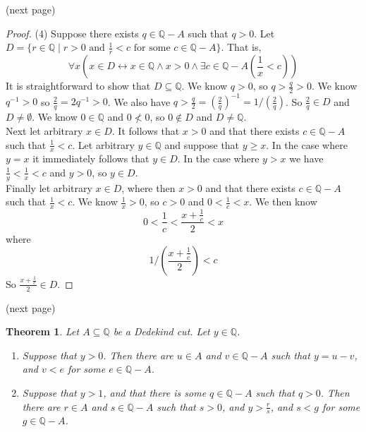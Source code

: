 \documentclass{report}
\newtheorem{theorem}[theo]{Theorem}
\begin{document}
\noindent(next page)\newpage
\begin{proof}(4)
Suppose there exists $q\in\mathbb Q-A$ such that $q>0$. 
Let $D=\{r\in\mathbb Q\mid r>0\text{ and }\frac{1}{r}<c\text{ for some }c\in\mathbb Q-A\}$. That is,
\begin{equation*}
\forall x\left(x\in D\leftrightarrow x\in\mathbb Q\land x>0\land\exists c\in\mathbb Q-A\left(\frac{1}{x}<c\right)\right)
\end{equation*}
It is straightforward to show that $D\subseteq\mathbb Q$.
We know $q>0$, so $q>\frac{q}{2}>0$. We know $q^{-1}>0$ so $\frac{2}{q}=2q^{-1}>0$. 
We also have $q>\frac{q}{2}=\left(\frac{2}{q}\right)^{-1}=1/(\frac{2}{q})$. So $\frac{2}{q}\in D$ and $D\neq\emptyset$. 
We know $0\in\mathbb Q$ and $0\nless0$, so $0\notin D$ and $D\neq\mathbb Q$.\\
\indent Next let arbitrary $x\in D$. It follows that $x>0$ and that there exists $c\in\mathbb Q-A$ such that $\frac{1}{x}<c$. 
Let arbitrary $y\in\mathbb Q$ and suppose that $y\geq x$. In the case where $y=x$ it immediately follows that $y\in D$. In the case where $y>x$
we have $\frac1y<\frac1x<c$ and $y>0$, so $y\in D$.\\
\indent Finally let arbitrary $x\in D$, where then $x>0$ and that there exists $c\in\mathbb Q-A$ such that $\frac{1}{x}<c$. We know
$\frac1x>0$, so $c>0$ and $0<\frac1c<x$. We then know
\begin{equation*}
0<\frac1c<\frac{x+\frac1c}{2}<x
\end{equation*}
where 
\begin{equation*}
1/\left(\frac{x+\frac1c}{2}\right)<c
\end{equation*}
So $\frac{x+\frac1c}{2}\in D$.
\end{proof}
\noindent(next page)\newpage
\begin{theorem}\label{ded_6}
Let $A\subseteq\mathbb Q$ be a Dedekind cut. Let $y\in\mathbb Q$.
\begin{enumerate}
\item Suppose that $y>0$. Then there are $u\in A$ and $v\in\mathbb Q-A$ such that $y=u-v$, and $v<e$ for some $e\in\mathbb Q-A$.
\item Suppose that $y>1$, and that there is some $q\in\mathbb Q-A$ such that $q>0$. Then there are $r\in A$ and $s\in\mathbb Q-A$ such that 
$s>0$, and $y>\frac rs$, and $s<g$ for some $g\in\mathbb Q-A$.
\end{enumerate}
\end{theorem}
\end{document}
